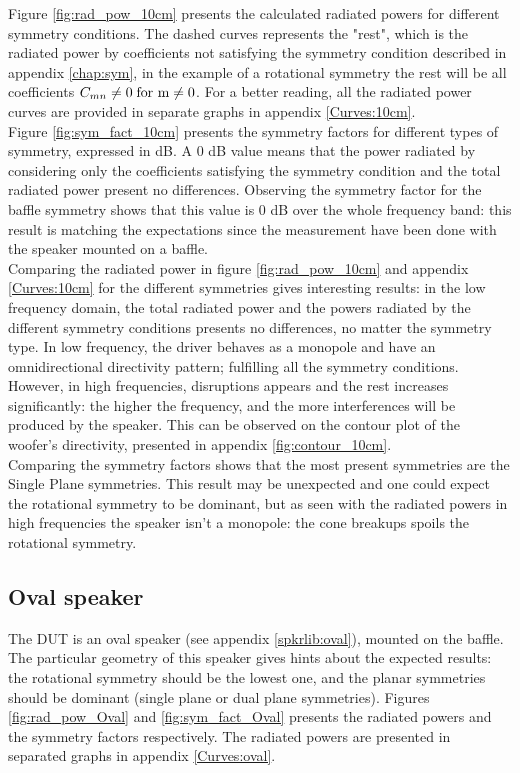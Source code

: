 \documentclass{report}
\begin{document}
Figure \ref{fig:rad_pow_10cm} presents the calculated radiated powers for different symmetry conditions. The dashed curves represents the "rest", which is the radiated power by coefficients not satisfying the symmetry condition described in appendix \ref{chap:sym}, in the example of a rotational symmetry the rest will be all coefficients $C_{mn} \neq 0 \;  \textup{for m}  \neq 0$. For a better reading, all the radiated power curves are provided in separate graphs in appendix \ref{Curves:10cm}.\\

Figure \ref{fig:sym_fact_10cm} presents the symmetry factors for different types of symmetry, expressed in dB. A 0 dB value means that the power radiated by considering only the coefficients satisfying the symmetry condition and the total radiated power present no differences. Observing the symmetry factor for the baffle symmetry shows that this value is 0 dB over the whole frequency band: this result is matching the expectations since the measurement have been done with the speaker mounted on a baffle. \\

Comparing the radiated power in figure \ref{fig:rad_pow_10cm} and appendix \ref{Curves:10cm} for the different symmetries gives interesting results: in the low frequency domain, the total radiated power and the powers radiated by the different symmetry conditions presents no differences, no matter the symmetry type. In low frequency, the driver behaves as a monopole and have an omnidirectional directivity pattern; fulfilling all the symmetry conditions. \\
However, in high frequencies, disruptions appears and the rest increases significantly: the higher the frequency, and the more interferences will be produced by the speaker. This can be observed on the contour plot of the woofer's directivity, presented in appendix \ref{fig:contour_10cm}. \\

Comparing the symmetry factors shows that the most present symmetries are the Single Plane symmetries. This result may be unexpected and one could expect the rotational symmetry to be dominant, but as seen with the radiated powers in high frequencies the speaker isn't a monopole: the cone breakups spoils the rotational symmetry. 

\subsection{Oval speaker}
The DUT is an oval speaker (see appendix \ref{spkrlib:oval}), mounted on the baffle. The particular geometry of this speaker gives hints about the expected results: the rotational symmetry should be the lowest one, and the planar symmetries should be dominant (single plane or dual plane symmetries).  Figures \ref{fig:rad_pow_Oval} and \ref{fig:sym_fact_Oval} presents the radiated powers and the symmetry factors respectively. The radiated powers are presented in separated graphs in appendix \ref{Curves:oval}.\\
\end{document}

